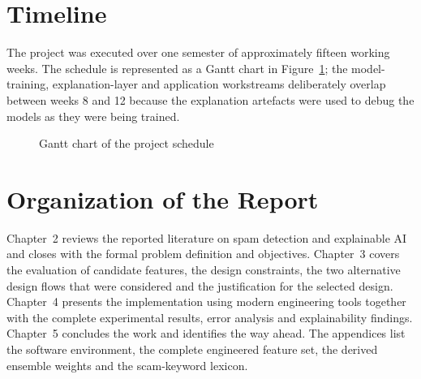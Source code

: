 \documentclass[12pt,a4paper]{report}
\begin{document}
\section{Timeline}

The project was executed over one semester of approximately fifteen working
weeks. The schedule is represented as a Gantt chart in
Figure~\ref{fig:gantt}; the model-training, explanation-layer and application
workstreams deliberately overlap between weeks 8 and 12 because the
explanation artefacts were used to debug the models as they were being
trained.

\begin{figure}[H]
  \centering
  \caption{Gantt chart of the project schedule}
  \label{fig:gantt}
\end{figure}

\section{Organization of the Report}

Chapter~2 reviews the reported literature on spam detection and explainable
AI and closes with the formal problem definition and objectives. Chapter~3
covers the evaluation of candidate features, the design constraints, the two
alternative design flows that were considered and the justification for the
selected design. Chapter~4 presents the implementation using modern
engineering tools together with the complete experimental results, error
analysis and explainability findings. Chapter~5 concludes the work and
identifies the way ahead. The appendices list the software environment, the
complete engineered feature set, the derived ensemble weights and the
scam-keyword lexicon.
\end{document}
